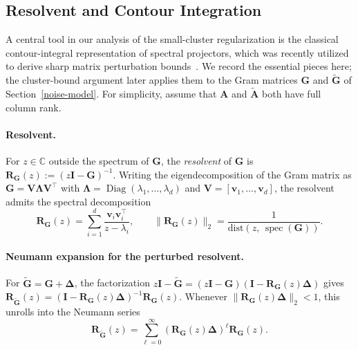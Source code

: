 \documentclass{article}
\newcommand{\twonorm}[1]{\|#1\|_2}
\newcommand{\Diag}{\operatorname{Diag}} %
\newcommand{\dist}{\mathrm{dist}}
\newcommand{\vb}{\mathbf{v}}
\newcommand{\Ab}{\mathbf{A}}
\newcommand{\Gb}{\mathbf{G}}
\newcommand{\Ib}{\mathbf{I}}
\newcommand{\Rb}{\mathbf{R}}
\newcommand{\Vb}{\mathbf{V}}
\newcommand{\Abtil}{\tilde{\Ab}}
\newcommand{\Gbtil}{\tilde{\Gb}}
\newcommand{\rbr}[1]{\left(#1\right)}
\newcommand{\Lambdab}{\mathbf{\Lambda}}
\newcommand{\Deltab}{\boldsymbol{\Delta}}
\begin{document}
\subsection{Resolvent and Contour Integration}\label{subsec:resolvent}
A central tool in our analysis of the small-cluster regularization is the classical contour-integral representation of spectral projectors, which was recently utilized to derive sharp matrix perturbation bounds~\citep{tran2026davis,tran2026eigenvaluestabilitynewperturbation,tran2026newmatrixperturbationbounds,tran2024matrixperturbationboundscontour,transpectral,tran2025new}. We record the essential pieces here; the cluster-bound argument later applies them to the Gram matrices $\Gb$ and $\Gbtil$ of Section~\ref{noise-model}. For simplicity, assume that $\Ab$ and $\Abtil$ both have full column rank.

\paragraph{Resolvent.} For $z \in \mathbb{C}$ outside the spectrum of $\Gb$, the \emph{resolvent} of $\Gb$ is $\Rb_\Gb(z) := (z\Ib - \Gb)^{-1}.$
Writing the eigendecomposition of the Gram matrix as $\Gb = \Vb\Lambdab\Vb^\top$ with $\Lambdab = \Diag(\lambda_1,\dots,\lambda_d)$ and $\Vb = [\vb_1,\dots,\vb_d]$, the resolvent admits the spectral decomposition
\begin{equation} \label{eq:resolvent_decomp}
    \Rb_\Gb(z) = \sum_{i=1}^{d}\frac{\vb_i\vb_i^\top}{z-\lambda_i}, \qquad \twonorm{\Rb_\Gb(z)} = \frac{1}{\dist(z,\,\operatorname{spec}(\Gb))}.
\end{equation}

\paragraph{Neumann expansion for the perturbed resolvent.} For $\Gbtil = \Gb + \Deltab$, the factorization $z\Ib - \Gbtil = (z\Ib - \Gb)(\Ib - \Rb_\Gb(z)\Deltab)$ gives $\Rb_{\Gbtil}(z) = (\Ib - \Rb_\Gb(z)\Deltab)^{-1}\Rb_\Gb(z)$. Whenever $\twonorm{\Rb_\Gb(z)\Deltab} < 1$, this unrolls into the Neumann series
\begin{equation}\label{eq:neumann}
    \Rb_{\Gbtil}(z) = \sum_{\ell=0}^{\infty}\rbr{\Rb_\Gb(z)\Deltab}^\ell \Rb_\Gb(z).
\end{equation}
\end{document}
